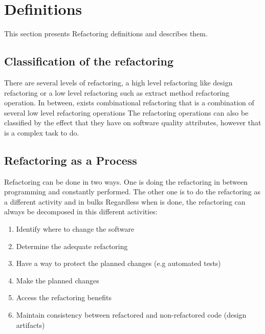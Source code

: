 \section{Definitions}


This section presents Refactoring definitions and describes them.

\subsection{Classification of the refactoring}
There are several levels of refactoring, a high level refactoring like design refactoring or a low level refactoring such as extract method refactoring operation. 
In between, exists combinational refactoring that is a combination of several low level refactoring operations
The refactoring operations can also be classified by the effect that they have on software quality attributes, however that is a complex task to do. \cite{elish2011classification}

\subsection{Refactoring as a Process}
Refactoring can be done in two ways. %
One is doing the refactoring in between programming and constantly performed. 
The other one is to do the refactoring as a different activity and in bulks
Regardless when is done, the refactoring can always be decomposed in this different activities:

\begin{enumerate}
 \item Identify where to change the software
 \item Determine the adequate refactoring
 \item Have a way to protect the planned changes (e.g automated tests)
 \item Make the planned changes
 \item Access the refactoring benefits
 \item Maintain consistency between refactored and non-refactored code (design artifacts)
\end{enumerate}




